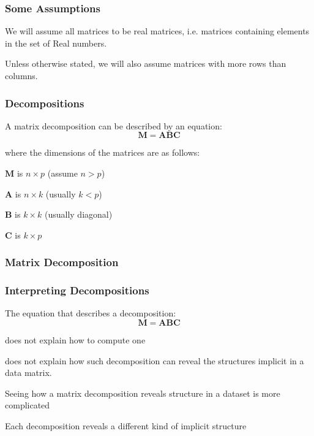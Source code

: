 \documentclass[12pt]{beamer}\usepackage[]{graphicx}\usepackage[]{color}
\begin{document}

\begin{frame}
\frametitle{Some Assumptions}

We will assume all matrices to be real matrices, i.e. matrices containing 
elements in the set of Real numbers.
\eb

Unless otherwise stated, we will also assume matrices with more rows than columns.
\eb

\end{frame}


\begin{frame}
\frametitle{Decompositions}

A matrix decomposition can be described by an equation:
$$
\mathbf{M} = \mathbf{A B C}
$$

where the dimensions of the matrices are as follows: 

\bbi
  \item $\mathbf{M}$ is $n \times p$ (assume $n > p$)
  \item $\mathbf{A}$ is $n \times k$ (usually $k < p$)
  \item $\mathbf{B}$ is $k \times k$ (usually diagonal)
  \item $\mathbf{C}$ is $k \times p$ 
\ei

\end{frame}


\begin{frame}
\frametitle{Matrix Decomposition}
\begin{center}
\end{center}
\end{frame}


\begin{frame}
\frametitle{Interpreting Decompositions}

The equation that describes a decomposition:
$$
\mathbf{M} = \mathbf{A B C}
$$

\bi
  \item does not explain how to compute one
  \item does not explain how such decomposition can reveal the
structures implicit in a data matrix.
  \item Seeing how a matrix decomposition reveals structure in a dataset is more 
complicated
  \item Each decomposition reveals a different kind of implicit structure
\ei

\end{frame}
\end{document}
